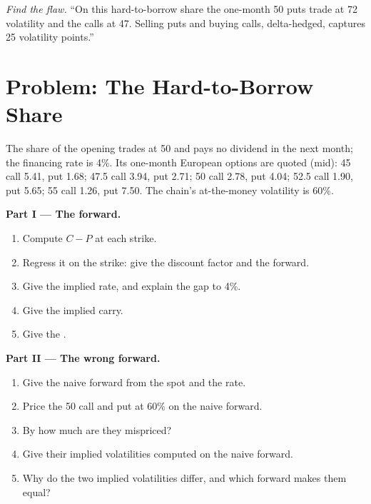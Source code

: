 \begin{exercise}[$\star\star\star$]\label{exo:dv:dividends-borrow-and-forwards:8}
\emph{Find the flaw.} ``On this hard-to-borrow share the one-month 50 puts trade at 72
volatility and the calls at 47. Selling puts and buying calls, delta-hedged, captures 25
volatility points.''
\end{exercise}

\section{Problem: The Hard-to-Borrow Share}

\begin{problem}\label{pb:dv:dividends-borrow-and-forwards:1}
The share of the opening trades at 50 and pays no dividend in the next month; the
financing rate is 4\%. Its one-month European options are quoted (mid): 45 call 5.41,
put 1.68; 47.5 call 3.94, put 2.71; 50 call 2.78, put 4.04; 52.5 call 1.90, put 5.65; 55
call 1.26, put 7.50. The chain's at-the-money volatility is 60\%.

\medskip\noindent\textbf{Part I --- The forward.}
\begin{enumerate}
\item Compute $C-P$ at each strike.
\item Regress it on the strike: give the discount factor and the forward.
\item Give the implied rate, and explain the gap to 4\%.
\item Give the implied carry.
\item Give the .
\end{enumerate}

\medskip\noindent\textbf{Part II --- The wrong forward.}
\begin{enumerate}[resume]
\item Give the naive forward from the spot and the rate.
\item Price the 50 call and put at 60\% on the naive forward.
\item By how much are they mispriced?
\item Give their implied volatilities computed on the naive forward.
\item Why do the two implied volatilities differ, and which forward makes them equal?
\end{enumerate}


\end{problem}
